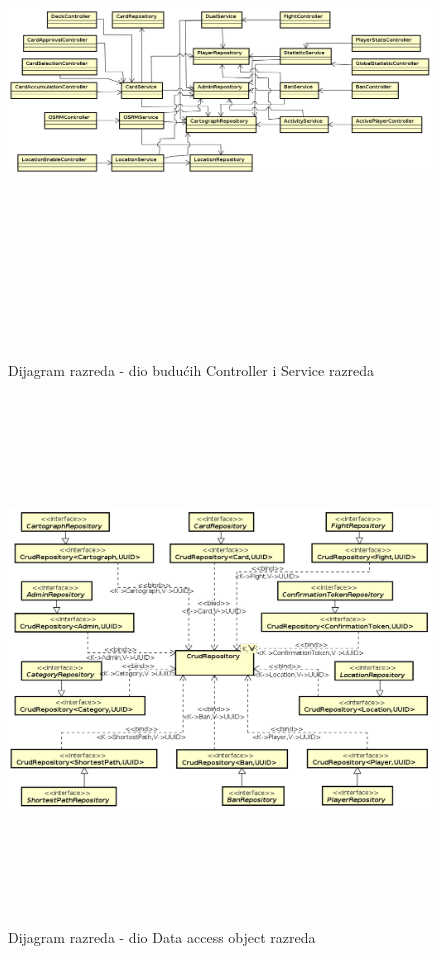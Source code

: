 			\begin{figure}[H]
				\includegraphics[width=\linewidth, height=14cm]{dijagrami/futureclass_diagram}				
				\centering
				\caption{Dijagram razreda - dio budućih Controller i Service razreda}
				\label{}
			\end{figure}
			
			\begin{figure}[H]
				\includegraphics[width=\linewidth, height=14cm]{dijagrami/daoclass_diagram}				
				\centering
				\caption{Dijagram razreda - dio Data access object razreda}
				\label{}
			\end{figure}
		
